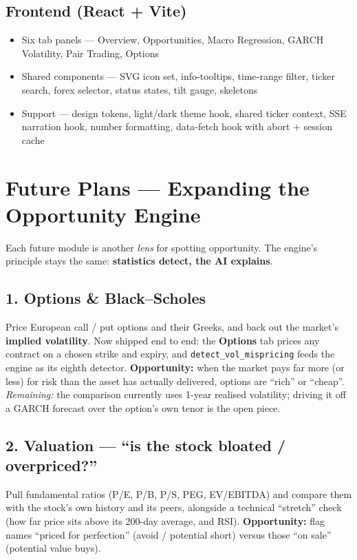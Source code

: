 \documentclass[11pt]{article}
\newcommand{\tk}[1]{\texttt{#1}}
\begin{document}
\subsection*{Frontend (React + Vite)}
\begin{itemize}
\item Six tab panels — Overview, Opportunities, Macro Regression, GARCH Volatility, Pair Trading, Options
\item Shared components — SVG icon set, info-tooltips, time-range filter, ticker
search, forex selector, status states, tilt gauge, skeletons
\item Support — design tokens, light/dark theme hook, shared ticker context,
SSE narration hook, number formatting, data-fetch hook with abort + session cache
\end{itemize}

\section{Future Plans — Expanding the Opportunity Engine}
Each future module is another \emph{lens} for spotting opportunity. The engine's
principle stays the same: \textbf{statistics detect, the AI explains}.

\subsection*{1. Options \& Black–Scholes }
Price European call / put options and their Greeks, and back out the market's
\textbf{implied volatility}. Now shipped end to end: the \textbf{Options} tab prices
any contract on a chosen strike and expiry, and \tk{detect\_vol\_mispricing} feeds the
engine as its eighth detector. \textbf{Opportunity:} when the market pays far more (or
less) for risk than the asset has actually delivered, options are ``rich'' or
``cheap''. \emph{Remaining:} the comparison currently uses 1-year realised volatility;
driving it off a GARCH forecast over the option's own tenor is the open piece.

\subsection*{2. Valuation — ``is the stock bloated / overpriced?''}
Pull fundamental ratios (P/E, P/B, P/S, PEG, EV/EBITDA) and compare them with the
stock's own history and its peers, alongside a technical ``stretch'' check (how far
price sits above its 200-day average, and RSI). \textbf{Opportunity:} flag names
``priced for perfection'' (avoid / potential short) versus those ``on sale''
(potential value buys).
\end{document}
